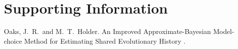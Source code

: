\documentclass[letterpaper,12pt]{article}
\newcommand{\msTitle}{An Improved Approximate-Bayesian Model-choice Method for
    Estimating Shared Evolutionary History \xspace}
\begin{document}


\newpage
\singlespacing

\renewcommand\listfigurename{Figure Captions}
\renewcommand\cftdotsep{\cftnodots}
\setlength\cftbeforefigskip{10pt}
\listoffigures



\newpage
\singlespacing



\clearpage

\newpage



\setcounter{figure}{0}
\setcounter{table}{0}
\setcounter{page}{1}
\setcounter{section}{0}

\singlespacing

\section*{Supporting Information}
\hangindent=1cm
Oaks, J.~R.\ and M.~T.\ Holder. \msTitle.

\newpage
\singlespacing


\end{document}
